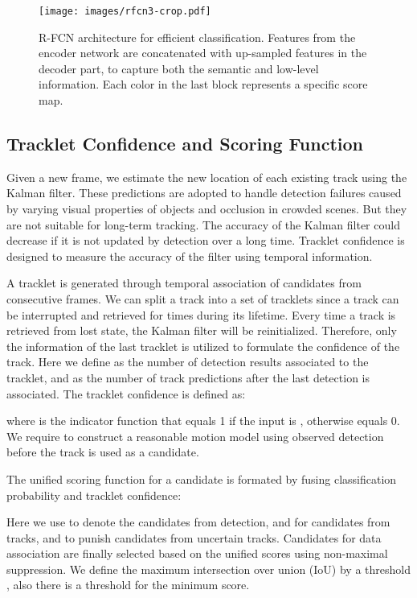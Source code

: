 \documentclass{article}
\begin{document}
\begin{figure}[t]
\begin{center}
\texttt{[image: images/rfcn3-crop.pdf]}
\end{center}
\caption{
R-FCN architecture for efficient classification.
Features from the encoder network are concatenated with up-sampled features in the decoder part,
to capture both the semantic and low-level information.
Each color in the last block represents a specific score map.
}
\label{fig:network}
\end{figure}


\subsection{Tracklet Confidence and Scoring Function}
\label{sec:conf}
Given a new frame, 
we estimate the new location of each existing track using the Kalman filter.
These predictions
are adopted to handle detection failures caused by varying visual properties of objects and occlusion in crowded scenes.
But they are not suitable for long-term tracking.
The accuracy of the Kalman filter could decrease if it is not updated by detection over a long time.
Tracklet confidence is designed to measure the accuracy of the filter using temporal information.



A tracklet is generated through temporal association
of candidates from consecutive frames.
We can split a track into a set of tracklets 
since a track can be interrupted and retrieved for times during its lifetime.
Every time a track is retrieved from lost state,
the Kalman filter will be reinitialized.
Therefore, only the information of the last tracklet is utilized to formulate the confidence of the track.
Here we define  as the number of detection results associated to the tracklet, 
and  as the number of track predictions after the last detection is associated.
The tracklet confidence is defined as:

where  is the indicator function that equals 1 if the input is
, otherwise equals 0.
We require  to construct a reasonable motion model using observed detection
before the track is used as a candidate.

The unified scoring function for a candidate  is formated 
by fusing classification probability and tracklet confidence:

Here we use  to denote the candidates from detection, and  for candidates from tracks,
and  to punish candidates from uncertain tracks.
Candidates for data association are finally selected based on the unified scores using non-maximal suppression.
We define the maximum intersection over union (IoU) by a threshold ,
also there is a threshold  for the minimum score.
\end{document}
